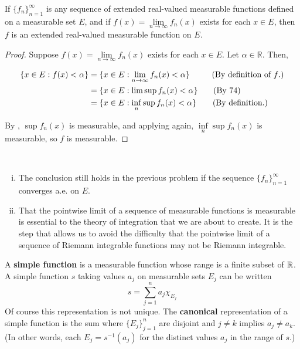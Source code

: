 \begin{pblm}\label{p:ext_real_val_seq}%
	If $\{f_n\}_{n=1}^\infty$ is any sequence of extended real-valued 
	measurable functions defined on a measurable set $E$, and if $f(x) = 
	\lim\limits_{n\to\infty}f_n(x)$ exists for each $x \in E$, then $f$ is an 
	extended real-valued measurable function on $E$. 
\begin{proof}
	Suppose $f(x) = \lim\limits_{n\to\infty} f_n(x)$ exists for each $x \in E$. Let $\alpha \in \mathbb{R}$. Then,

	\begin{align*}
		\{ x\in E : f(x) < \alpha \}
		&= \{ x \in E : \lim\limits_{n\to\infty}f_n(x) < \alpha \} \hspace{27 pt} \text{(By definition of $f$.)} \\
		&= \{ x \in E : \lim \sup f_n(x) < \alpha \} \hspace{19 pt} \text{(By 74)} \\
		&= \{ x \in E : \inf\limits_n \sup f_n(x) < \alpha \} \hspace{20 pt} \text{(By definition.)}
	\end{align*}
	
	By , $\sup f_n(x)$ is measurable, 
	and applying  again, $\inf\limits_{n} \sup f_n(x)$ 
	is measurable, so $f$ is measurable.
\end{proof}
\end{pblm}

\begin{rmk}%
	~
	\begin{enumerate}[(i)]
	\item The conclusion still holds in the previous problem if the sequence 
	$\{f_n\}_{n=1}^\infty$ converges a.e. on $E$. 
	\item That the pointwise limit of a sequence of measurable functions is 
	measurable is essential to the theory of integration that we are about to 
	create. It is the step that allows us to avoid the difficulty that the 
	pointwise limit of a sequence of Riemann integrable functions may not be 
	Riemann integrable. 
	\end{enumerate}
\end{rmk}

\begin{defn}\label{d:simplefunction}%
	A \textbf{simple function} is a measurable function whose range is a finite 
	subset of $\mathbb{R}$. A simple function $s$ taking values $a_j$ on measurable 
	sets $E_j$ can be written 
	\begin{equation*}
		s = \sum\limits_{j=1}^n a_j \chi_{E_j}
	\end{equation*}
	Of course this representation is not unique. The \textbf{canonical} 
	representation of a simple function is the sum where $\{E_j\}_{j=1}^n$ 
	are disjoint and $j \neq k$ implies $a_j \neq a_k$. (In other words, each 
	$E_j = s^{-1} (a_j)$ for the distinct values $a_j$ in the range of $s$.)
\end{defn}

